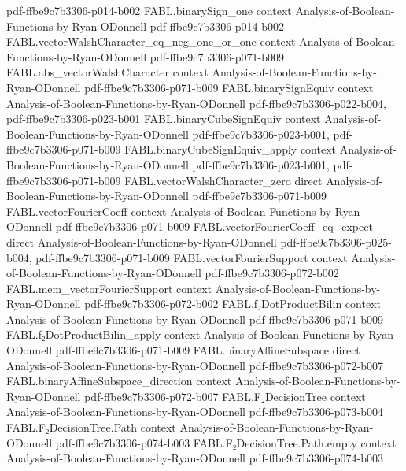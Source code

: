 \begin{theorem}
  {pdf-ffbe9c7b3306-p014-b002}
\proofstep
  {FABL.binarySign_one}
  {context}
  {Analysis-of-Boolean-Functions-by-Ryan-ODonnell}
  {pdf-ffbe9c7b3306-p014-b002}
\proofstep
  {FABL.vectorWalshCharacter_eq_neg_one_or_one}
  {context}
  {Analysis-of-Boolean-Functions-by-Ryan-ODonnell}
  {pdf-ffbe9c7b3306-p071-b009}
\proofstep
  {FABL.abs_vectorWalshCharacter}
  {context}
  {Analysis-of-Boolean-Functions-by-Ryan-ODonnell}
  {pdf-ffbe9c7b3306-p071-b009}
\proofstep
  {FABL.binarySignEquiv}
  {context}
  {Analysis-of-Boolean-Functions-by-Ryan-ODonnell}
  {pdf-ffbe9c7b3306-p022-b004,
    pdf-ffbe9c7b3306-p023-b001}
\proofstep
  {FABL.binaryCubeSignEquiv}
  {context}
  {Analysis-of-Boolean-Functions-by-Ryan-ODonnell}
  {pdf-ffbe9c7b3306-p023-b001,
    pdf-ffbe9c7b3306-p071-b009}
\proofstep
  {FABL.binaryCubeSignEquiv_apply}
  {context}
  {Analysis-of-Boolean-Functions-by-Ryan-ODonnell}
  {pdf-ffbe9c7b3306-p023-b001,
    pdf-ffbe9c7b3306-p071-b009}
\proofstep
  {FABL.vectorWalshCharacter_zero}
  {direct}
  {Analysis-of-Boolean-Functions-by-Ryan-ODonnell}
  {pdf-ffbe9c7b3306-p071-b009}
\proofstep
  {FABL.vectorFourierCoeff}
  {context}
  {Analysis-of-Boolean-Functions-by-Ryan-ODonnell}
  {pdf-ffbe9c7b3306-p071-b009}
\proofstep
  {FABL.vectorFourierCoeff_eq_expect}
  {direct}
  {Analysis-of-Boolean-Functions-by-Ryan-ODonnell}
  {pdf-ffbe9c7b3306-p025-b004,
    pdf-ffbe9c7b3306-p071-b009}
\proofstep
  {FABL.vectorFourierSupport}
  {context}
  {Analysis-of-Boolean-Functions-by-Ryan-ODonnell}
  {pdf-ffbe9c7b3306-p072-b002}
\proofstep
  {FABL.mem_vectorFourierSupport}
  {context}
  {Analysis-of-Boolean-Functions-by-Ryan-ODonnell}
  {pdf-ffbe9c7b3306-p072-b002}
\proofstep
  {FABL.f₂DotProductBilin}
  {context}
  {Analysis-of-Boolean-Functions-by-Ryan-ODonnell}
  {pdf-ffbe9c7b3306-p071-b009}
\proofstep
  {FABL.f₂DotProductBilin_apply}
  {context}
  {Analysis-of-Boolean-Functions-by-Ryan-ODonnell}
  {pdf-ffbe9c7b3306-p071-b009}
\proofstep
  {FABL.binaryAffineSubspace}
  {direct}
  {Analysis-of-Boolean-Functions-by-Ryan-ODonnell}
  {pdf-ffbe9c7b3306-p072-b007}
\proofstep
  {FABL.binaryAffineSubspace_direction}
  {context}
  {Analysis-of-Boolean-Functions-by-Ryan-ODonnell}
  {pdf-ffbe9c7b3306-p072-b007}
\proofstep
  {FABL.F₂DecisionTree}
  {context}
  {Analysis-of-Boolean-Functions-by-Ryan-ODonnell}
  {pdf-ffbe9c7b3306-p073-b004}
\proofstep
  {FABL.F₂DecisionTree.Path}
  {context}
  {Analysis-of-Boolean-Functions-by-Ryan-ODonnell}
  {pdf-ffbe9c7b3306-p074-b003}
\proofstep
  {FABL.F₂DecisionTree.Path.empty}
  {context}
  {Analysis-of-Boolean-Functions-by-Ryan-ODonnell}
  {pdf-ffbe9c7b3306-p074-b003}

\end{theorem}
